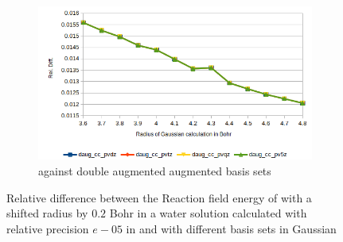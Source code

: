 \documentclass[../Thesis.tex]{subfiles}
\begin{document}
\begin{figure}[h!]
\begin{subfigure}[b]{0.75\linewidth}
    \includegraphics[width=\linewidth]{img/lipdaugreldiff02.png}
    \caption{\mrchem against double augmented augmented basis sets}
  \end{subfigure}
  \caption[Relative difference between methods for  with radius $+0.2$ Bohr]{Relative difference between the Reaction field energy of  with a shifted radius by $0.2$ Bohr in a water solution calculated with relative precision $e-05$ in \mrchem
  and with different basis sets in Gaussian}
  \label{fig:lipreldiff02}
\end{figure}
\end{document}
